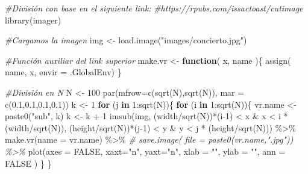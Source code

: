 \documentclass[
]{book}
\newenvironment{Shaded}{\begin{snugshade}}{\end{snugshade}}
\newcommand{\AttributeTok}[1]{\textcolor[rgb]{0.77,0.63,0.00}{#1}}
\newcommand{\CommentTok}[1]{\textcolor[rgb]{0.56,0.35,0.01}{\textit{#1}}}
\newcommand{\ConstantTok}[1]{\textcolor[rgb]{0.00,0.00,0.00}{#1}}
\newcommand{\ControlFlowTok}[1]{\textcolor[rgb]{0.13,0.29,0.53}{\textbf{#1}}}
\newcommand{\DecValTok}[1]{\textcolor[rgb]{0.00,0.00,0.81}{#1}}
\newcommand{\FloatTok}[1]{\textcolor[rgb]{0.00,0.00,0.81}{#1}}
\newcommand{\FunctionTok}[1]{\textcolor[rgb]{0.00,0.00,0.00}{#1}}
\newcommand{\NormalTok}[1]{#1}
\newcommand{\OtherTok}[1]{\textcolor[rgb]{0.56,0.35,0.01}{#1}}
\newcommand{\SpecialCharTok}[1]{\textcolor[rgb]{0.00,0.00,0.00}{#1}}
\newcommand{\StringTok}[1]{\textcolor[rgb]{0.31,0.60,0.02}{#1}}
\begin{document}
\begin{Shaded}
\begin{Highlighting}[]
\CommentTok{\#División con base en el siguiente link:}
\CommentTok{\#https://rpubs.com/issactoast/cutimage}
\FunctionTok{library}\NormalTok{(imager)}

\CommentTok{\#Cargamos la imagen}
\NormalTok{img }\OtherTok{\textless{}{-}} \FunctionTok{load.image}\NormalTok{(}\StringTok{"images/concierto.jpg"}\NormalTok{)}

\CommentTok{\#Función auxiliar del link superior}
\NormalTok{make.vr }\OtherTok{\textless{}{-}} \ControlFlowTok{function}\NormalTok{( x, name )\{}
  \FunctionTok{assign}\NormalTok{( name, x, }\AttributeTok{envir =}\NormalTok{ .GlobalEnv)}
\NormalTok{\}}

\CommentTok{\#División en N}
\NormalTok{N }\OtherTok{\textless{}{-}} \DecValTok{100}
\FunctionTok{par}\NormalTok{(}\AttributeTok{mfrow=}\FunctionTok{c}\NormalTok{(}\FunctionTok{sqrt}\NormalTok{(N),}\FunctionTok{sqrt}\NormalTok{(N)), }\AttributeTok{mar =} \FunctionTok{c}\NormalTok{(}\FloatTok{0.1}\NormalTok{,}\FloatTok{0.1}\NormalTok{,}\FloatTok{0.1}\NormalTok{,}\FloatTok{0.1}\NormalTok{))}
\NormalTok{k }\OtherTok{\textless{}{-}} \DecValTok{1}
\ControlFlowTok{for}\NormalTok{ (j }\ControlFlowTok{in} \DecValTok{1}\SpecialCharTok{:}\FunctionTok{sqrt}\NormalTok{(N))\{}
  \ControlFlowTok{for}\NormalTok{ (i }\ControlFlowTok{in} \DecValTok{1}\SpecialCharTok{:}\FunctionTok{sqrt}\NormalTok{(N))\{}
\NormalTok{    vr.name }\OtherTok{\textless{}{-}} \FunctionTok{paste0}\NormalTok{(}\StringTok{"sub"}\NormalTok{, k)}
\NormalTok{    k       }\OtherTok{\textless{}{-}}\NormalTok{ k }\SpecialCharTok{+} \DecValTok{1}
    \FunctionTok{imsub}\NormalTok{(img, (width}\SpecialCharTok{/}\FunctionTok{sqrt}\NormalTok{(N))}\SpecialCharTok{*}\NormalTok{(i}\DecValTok{{-}1}\NormalTok{) }\SpecialCharTok{\textless{}}\NormalTok{ x }\SpecialCharTok{\&}\NormalTok{ x }\SpecialCharTok{\textless{}}\NormalTok{  i }\SpecialCharTok{*}\NormalTok{ (width}\SpecialCharTok{/}\FunctionTok{sqrt}\NormalTok{(N)),}
\NormalTok{          (height}\SpecialCharTok{/}\FunctionTok{sqrt}\NormalTok{(N))}\SpecialCharTok{*}\NormalTok{(j}\DecValTok{{-}1}\NormalTok{) }\SpecialCharTok{\textless{}}\NormalTok{ y }\SpecialCharTok{\&}\NormalTok{ y }\SpecialCharTok{\textless{}}\NormalTok{  j }\SpecialCharTok{*}\NormalTok{ (height}\SpecialCharTok{/}\FunctionTok{sqrt}\NormalTok{(N))) }\SpecialCharTok{\%\textgreater{}\%}
      \FunctionTok{make.vr}\NormalTok{(}\AttributeTok{name =}\NormalTok{ vr.name) }\SpecialCharTok{\%\textgreater{}\%}
      \CommentTok{\# save.image( file = paste0(vr.name,".jpg")) \%\textgreater{}\%}
      \FunctionTok{plot}\NormalTok{(}\AttributeTok{axes =} \ConstantTok{FALSE}\NormalTok{,}
           \AttributeTok{xaxt=}\StringTok{"n"}\NormalTok{, }\AttributeTok{yaxt=}\StringTok{"n"}\NormalTok{, }
           \AttributeTok{xlab =} \StringTok{""}\NormalTok{, }\AttributeTok{ylab =} \StringTok{""}\NormalTok{, }\AttributeTok{ann =} \ConstantTok{FALSE}\NormalTok{ )    }
\NormalTok{  \}}
\NormalTok{\}}
\end{Highlighting}
\end{Shaded}
\end{document}
